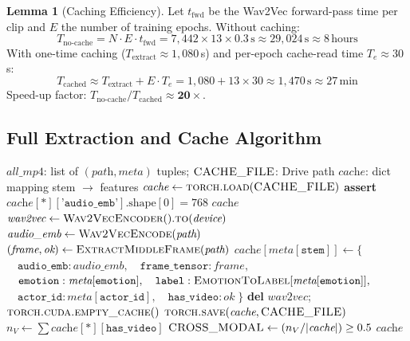 \documentclass[12pt,a4paper]{article}
\theoremstyle{definition}
\newtheorem{lemma}[theorem]{Lemma}
\theoremstyle{remark}
\begin{document}
\begin{lemma}[Caching Efficiency]
\label{lem:cache_speedup}
Let $t_{\text{fwd}}$ be the Wav2Vec forward-pass time per clip and $E$ the
number of training epochs. Without caching:
\[
  T_{\text{no-cache}} = N \cdot E \cdot t_{\text{fwd}} = 7{,}442 \times 13 \times 0.3\,\text{s}
  \approx 29{,}024\,\text{s} \approx 8\,\text{hours}
\]
With one-time caching ($T_{\text{extract}} \approx 1{,}080$\,s) and per-epoch
cache-read time $T_e \approx 30$\,s:
\[
  T_{\text{cached}} \approx T_{\text{extract}} + E \cdot T_e
  = 1{,}080 + 13 \times 30 \approx 1{,}470\,\text{s} \approx 27\,\text{min}
\]
Speed-up factor: $T_{\text{no-cache}}/T_{\text{cached}} \approx \mathbf{20\times}$.
\end{lemma}

\subsection{Full Extraction and Cache Algorithm}

\begin{algorithm}[H]
\caption{One-Time Feature Extraction and Cache}
\label{alg:cache}
\begin{algorithmic}[1]
\Require $\textit{all\_mp4}$: list of $(\textit{path}, \textit{meta})$ tuples;
         $\textsc{CACHE\_FILE}$: Drive path
\Ensure $\textit{cache}$: dict mapping stem $\to$ features
  \State $\textit{cache} \gets \textsc{torch.load}(\textsc{CACHE\_FILE})$
  \State \textbf{assert} $\textit{cache}[*][\texttt{'audio\_emb'}].\text{shape}[0] = 768$
  \State \Return $\textit{cache}$ 
\EndIf
\State $\textit{wav2vec} \gets \textsc{Wav2VecEncoder}().\textsc{to}(\textit{device})$
  \State $\textit{audio\_emb} \gets \textsc{Wav2VecEncode}(\textit{path})$
  \State $(\textit{frame}, \textit{ok}) \gets \textsc{ExtractMiddleFrame}(\textit{path})$
  \State $\textit{cache}[\textit{meta}[\texttt{stem}]] \gets \{$
  \State $\quad \texttt{audio\_emb}: \textit{audio\_emb},\quad
               \texttt{frame\_tensor}: \textit{frame},$
  \State $\quad \texttt{emotion}: \textit{meta}[\texttt{emotion}],\quad
               \texttt{label}: \textsc{EmotionToLabel}[\textit{meta}[\texttt{emotion}]],$
  \State $\quad \texttt{actor\_id}: \textit{meta}[\texttt{actor\_id}],\quad
               \texttt{has\_video}: \textit{ok}\;\}$
\EndFor
\State \textbf{del} $\textit{wav2vec}$; $\textsc{torch.cuda.empty\_cache}()$
\State $\textsc{torch.save}(\textit{cache}, \textsc{CACHE\_FILE})$
\State $n_V \gets \sum \textit{cache}[*][\texttt{has\_video}]$
\State $\textsc{CROSS\_MODAL} \gets (n_V / |\textit{cache}|) \geq 0.5$
\State \Return $\textit{cache}$
\end{algorithmic}
\end{algorithm}
\end{document}
